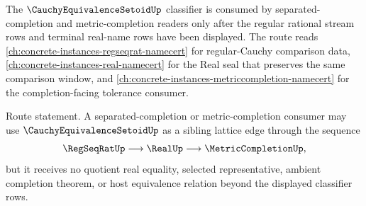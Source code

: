 The $\CauchyEquivalenceSetoidUp$ classifier is consumed by separated-completion and metric-completion readers only after the regular rational stream rows and terminal real-name rows have been displayed. The route reads \autoref{ch:concrete-instances-regseqrat-namecert} for regular-Cauchy comparison data, \autoref{ch:concrete-instances-real-namecert} for the Real seal that preserves the same comparison window, and \autoref{ch:concrete-instances-metriccompletion-namecert} for the completion-facing tolerance consumer.

Route statement. A separated-completion or metric-completion consumer may use $\CauchyEquivalenceSetoidUp$ as a sibling lattice edge through the sequence
$$
\RegSeqRatUp \longrightarrow \RealUp \longrightarrow \MetricCompletionUp,
$$
but it receives no quotient real equality, selected representative, ambient completion theorem, or host equivalence relation beyond the displayed classifier rows.
